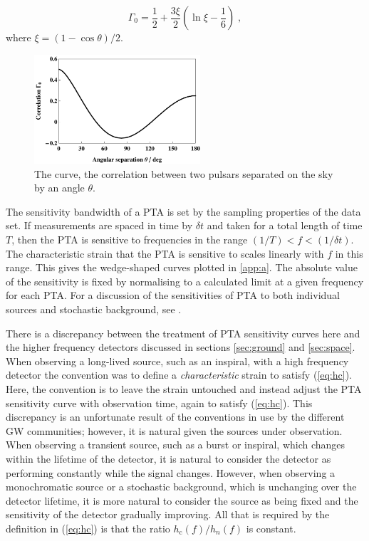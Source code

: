 \begin{equation}
\Gamma_{0} = \frac{1}{2}+\frac{3\xi}{2}\left(\ln \xi -\frac{1}{6}\right) \; ,
\end{equation}
where $\xi = (1-\cos\theta)/{2}.$
\begin{figure}
 \centering
 \includegraphics[trim=0cm 0cm 0cm 0cm, width=0.55\textwidth]{Fig_Hellings_Downs}
 \caption{The \citet{HellingsDowns} curve, the correlation between two pulsars separated on the sky by an angle $\theta$.}
 \label{fig:HnD}
\end{figure}

The sensitivity bandwidth of a PTA is set by the sampling properties of the data set. If measurements are spaced in time by $\delta t$ and taken for a total length of time $T$, then the PTA is sensitive to frequencies in the range $(1/T) < f < (1/\delta t)$. The characteristic strain that the PTA is sensitive to scales linearly with $f$ in this range. This gives the wedge-shaped curves plotted in \ref{app:a}. The absolute value of the sensitivity is fixed by normalising to a calculated limit at a given frequency for each PTA. For a discussion of the sensitivities of PTA to both individual sources and stochastic background, see \citet{MooreTaylorGair}.

There is a discrepancy between the treatment of PTA sensitivity curves here and the higher frequency detectors discussed in sections \ref{sec:ground} and \ref{sec:space}. When observing a long-lived source, such as an inspiral, with a high frequency detector the convention was to define a \emph{characteristic} strain to satisfy (\ref{eq:hc}). Here, the convention is to leave the strain untouched and instead adjust the PTA sensitivity curve with observation time, again to satisfy (\ref{eq:hc}). This discrepancy is an unfortunate result of the conventions in use by the different GW communities; however, it is natural given the sources under observation. When observing a transient source, such as a burst or inspiral, which changes within the lifetime of the detector, it is natural to consider the detector as performing constantly while the signal changes. However, when observing a monochromatic source or a stochastic background, which is unchanging over the detector lifetime, it is more natural to consider the source as being fixed and the sensitivity of the detector gradually improving. All that is required by the definition in (\ref{eq:hc}) is that the ratio $h_\mathrm{c}(f)/h_{n}(f)$ is constant.


